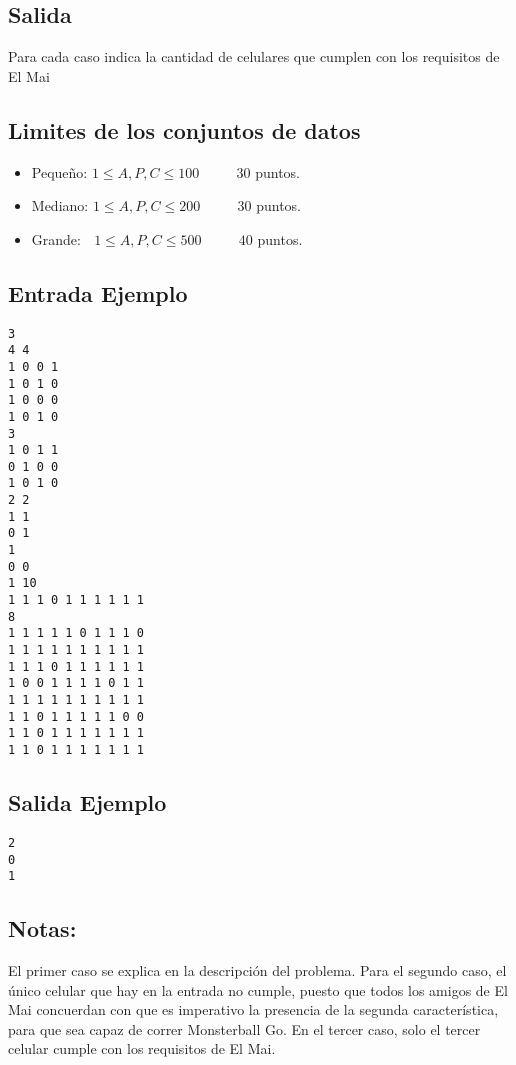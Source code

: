 \subsection*{Salida}
Para cada caso indica la cantidad de celulares que cumplen con los requisitos de El Mai

\subsection*{Limites de los conjuntos de datos}

\begin{itemize}
\item Pequeño: $ 1\leq A, P, C \leq 100 $ $\quad \quad$ $30$ puntos.
\item Mediano: $ 1\leq A, P, C \leq 200 $ $\quad \quad$ $30$ puntos.
\item Grande: $\,\;\,  1\leq A, P, C \leq 500 $ $\quad \quad$ $40$ puntos.
\end{itemize}
\newpage

\begin{multicols}{2}
\subsection*{Entrada Ejemplo}
\begin{verbatim}
3
4 4
1 0 0 1
1 0 1 0
1 0 0 0
1 0 1 0
3
1 0 1 1
0 1 0 0
1 0 1 0
2 2
1 1
0 1
1
0 0
1 10
1 1 1 0 1 1 1 1 1 1
8
1 1 1 1 1 0 1 1 1 0
1 1 1 1 1 1 1 1 1 1
1 1 1 0 1 1 1 1 1 1
1 0 0 1 1 1 1 0 1 1
1 1 1 1 1 1 1 1 1 1
1 1 0 1 1 1 1 1 0 0
1 1 0 1 1 1 1 1 1 1
1 1 0 1 1 1 1 1 1 1
\end{verbatim}
\columnbreak
\subsection*{Salida Ejemplo}
\begin{verbatim}
2
0
1
\end{verbatim}
\end{multicols}

\subsection*{Notas:}
El primer caso se explica en la descripción del problema.
Para el segundo caso, el único celular que hay en la entrada no cumple, puesto que todos los amigos de El Mai concuerdan con que es imperativo la presencia de la segunda característica, para que sea capaz de correr Monsterball Go.
En el tercer caso, solo el tercer celular cumple con los requisitos de El Mai.
